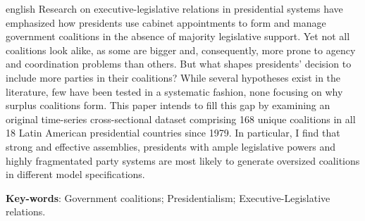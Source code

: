\begin{resumo}[Abstract]
 \begin{otherlanguage*}{english}
Research on executive-legislative relations in presidential systems have emphasized how presidents use cabinet appointments to form and manage government coalitions in the absence of majority legislative support. Yet not all coalitions look alike, as some are bigger and, consequently, more prone to agency and coordination problems than others. But what shapes presidents' decision to include more parties in their coalitions? While several hypotheses exist in the literature, few have been tested in a systematic fashion, none focusing on why surplus coalitions form. This paper intends to fill this gap by examining an original time-series cross-sectional dataset comprising 168 unique coalitions in all 18 Latin American presidential countries since 1979. In particular, I find that strong and effective assemblies, presidents with ample legislative powers and highly fragmentated party systems are most likely to generate oversized coalitions in different model specifications.

\vspace{\onelineskip}
\noindent
\textbf{Key-words}: Government coalitions;  Presidentialism; Executive-Legislative relations.
 \end{otherlanguage*}
\end{resumo}